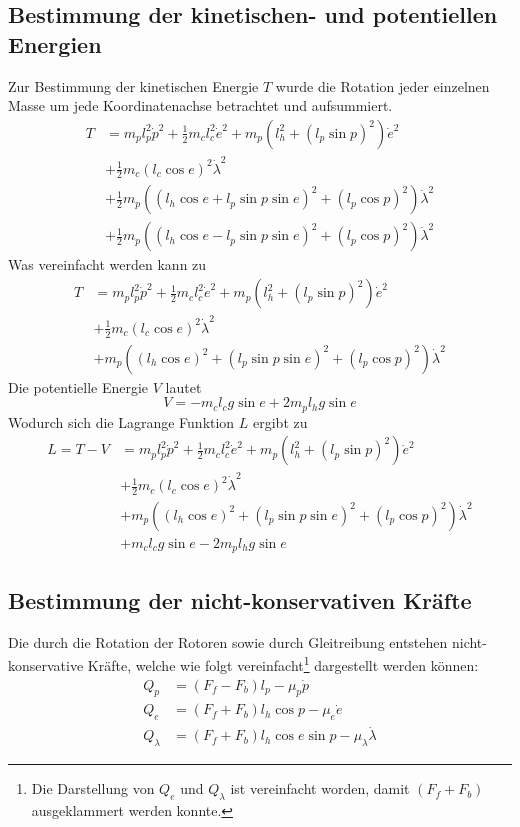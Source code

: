 \documentclass{article}
\begin{document}
	\subsection{Bestimmung der kinetischen- und potentiellen Energien}
	Zur Bestimmung der kinetischen Energie $T$ wurde die Rotation jeder einzelnen Masse um jede Koordinatenachse betrachtet und aufsummiert.
	\begin{equation}
	\begin{split}
	T&= m_p l_p^2\dot{p}^2 + \frac{1}{2}m_cl_c^2\dot{e}^2 
	+ m_p(l_h^2+(l_p\sin p)^2)\dot{e}^2\\
	&+ \frac{1}{2} m_c (l_c \cos e)^2\dot{\lambda}^2\\
	&+ \frac{1}{2} m_p((l_h \cos e +l_p \sin p \sin e)^2+(l_p \cos p)^2)\dot{\lambda}^2\\
	&+ \frac{1}{2} m_p((l_h \cos e -l_p \sin p \sin e)^2+(l_p \cos p)^2)\dot{\lambda}^2
	\end{split}
	\end{equation}
	Was vereinfacht werden kann zu
	\begin{equation}
	\begin{split}
	T&= m_p l_p^2\dot{p}^2 + \frac{1}{2}m_cl_c^2\dot{e}^2 
	+ m_p(l_h^2+(l_p\sin p)^2)\dot{e}^2\\
	&+ \frac{1}{2} m_c (l_c \cos e)^2\dot{\lambda}^2\\
	&+ m_p((l_h \cos e)^2 + (l_p \sin p \sin e)^2+(l_p \cos p)^2)\dot{\lambda}^2
	\end{split}
	\end{equation}
	Die potentielle Energie $V$ lautet
	\begin{equation}
	V = -m_c l_c g \sin e + 2 m_p l_h g \sin e
	\end{equation}
	Wodurch sich die Lagrange Funktion $L$ ergibt zu 
	\begin{equation}
	\begin{split}
	L = T - V&= m_p l_p^2\dot{p}^2 + \frac{1}{2}m_cl_c^2\dot{e}^2 
	+ m_p(l_h^2+(l_p\sin p)^2)\dot{e}^2\\
	&+ \frac{1}{2} m_c (l_c \cos e)^2\dot{\lambda}^2\\
	&+ m_p((l_h \cos e)^2 + (l_p \sin p \sin e)^2+(l_p \cos p)^2)\dot{\lambda}^2\\
	&+ m_c l_c g \sin e - 2 m_p l_h g \sin e
	\end{split}
	\end{equation}
	\subsection{Bestimmung der nicht-konservativen Kräfte}
	Die durch die Rotation der Rotoren sowie durch Gleitreibung entstehen nicht-konservative Kräfte, welche wie folgt vereinfacht\footnote{Die Darstellung von $Q_e$ und $Q_\lambda$ ist vereinfacht worden, damit $(F_f + F_b)$ ausgeklammert werden konnte.} dargestellt werden können:
	\begin{align}
	Q_p &= (F_f - F_b)l_p - \mu_p \dot{p} \\
	Q_e &= (F_f + F_b)l_h  \cos p - \mu_e \dot{e}\\
	Q_\lambda &= (F_f + F_b)l_h \cos e \sin p - \mu_\lambda \dot{\lambda}
	\end{align}
\end{document}
